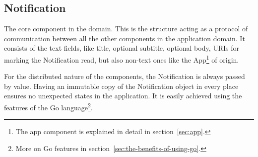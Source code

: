 \subsection{Notification}\label{sec:notification}

The core component in the domain.
This is the structure
acting as a protocol of communication
between all the other components
in the application domain.
It consists of the text fields,
like title, optional subtitle, optional body,
\acp{URI} for marking the Notification read,
but also non-text ones like the App\footnote{
  The app component is explained in detail in section~\ref{sec:app}.
} of origin.

For the distributed nature of the components,
the Notification is always passed by value.
Having an immutable copy of the Notification object
in every place ensures
no unexpected states in the application.
It is easily achieved
using the features of
the Go language\footnote{
  More on Go features in section~\ref{sec:the-benefits-of-using-go}.
}.
